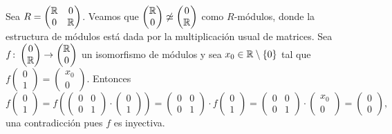 \begin{example}
	Sea $R=
		\begin{pmatrix}
			\mathbb{R} & 0\\
			0 & \mathbb{R}
		\end{pmatrix}$. 
	Veamos que
	$\begin{pmatrix}
			\mathbb{R}\\
			0
		\end{pmatrix}
		\not\simeq\begin{pmatrix}
			0\\
			\mathbb{R}
		\end{pmatrix}$
	como $R$-módulos, donde la estructura de módulos está dada por la multiplicación usual de matrices. 
	Sea 
	$f\colon\begin{pmatrix}
			0\\
			\mathbb{R}
		\end{pmatrix}
		\to\begin{pmatrix}
			\mathbb{R}\\
			0
		\end{pmatrix}$  
	un isomorfismo de módulos y sea 
	$x_0\in\mathbb{R}\setminus\{0\}$ 
	tal que $f\begin{pmatrix}0\\1\end{pmatrix}=\begin{pmatrix}x_0\\0\end{pmatrix}$. Entonces
	\[
	f\begin{pmatrix}
	0\\
	1\end{pmatrix}
	=f\left(\begin{pmatrix}
	0&0\\
	0&1\end{pmatrix}
	\cdot 
	\begin{pmatrix}
	0\\
	1
	\end{pmatrix}\right)
	=\begin{pmatrix}
	0&0\\
	0&1\end{pmatrix}\cdot f\begin{pmatrix}0\\1\end{pmatrix}
	=\begin{pmatrix}
	0&0\\
	0&1
	\end{pmatrix}
	\cdot 
	\begin{pmatrix}		
	x_0\\
	0
	\end{pmatrix}
	=\begin{pmatrix}
	0\\
	0
	\end{pmatrix},
	\]	
	una contradicción pues $f$ es inyectiva.   
\end{example}

